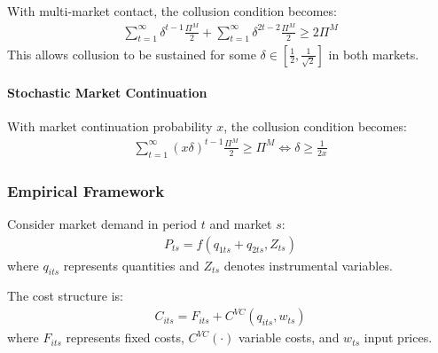 \documentclass[11pt]{elegantbook_2}
\begin{document}
With multi-market contact, the collusion condition becomes:
\begin{equation}
    \begin{aligned}
        \sum_{t=1}^\infty\delta^{t-1}\frac{\Pi^M}{2}+\sum_{t=1}^\infty\delta^{2t-2}\frac{\Pi^M}{2}\geq 2\Pi^M
    \end{aligned}
    \nonumber
\end{equation}
This allows collusion to be sustained for some $\delta\in \left[\frac{1}{2},\frac{1}{\sqrt{2}}\right]$ in both markets.

\paragraph*{Stochastic Market Continuation}
With market continuation probability $x$, the collusion condition becomes:
\begin{equation}
    \begin{aligned}
        \sum_{t=1}^\infty (x\delta)^{t-1}\frac{\Pi^M}{2}\geq \Pi^M
        \Leftrightarrow \delta\geq \frac{1}{2x}
    \end{aligned}
    \nonumber
\end{equation}

\subsubsection{Empirical Framework}
Consider market demand in period $t$ and market $s$:
\begin{equation}
    \begin{aligned}
        P_{ts}=f\left(q_{1ts}+q_{2ts},Z_{ts}\right)
    \end{aligned}
    \nonumber
\end{equation}
where $q_{its}$ represents quantities and $Z_{ts}$ denotes instrumental variables.

The cost structure is:
\begin{equation}
    \begin{aligned}
        C_{its}=F_{its}+C^{VC}\left(q_{its},w_{ts}\right)
    \end{aligned}
    \nonumber
\end{equation}
where $F_{its}$ represents fixed costs, $C^{VC}(\cdot)$ variable costs, and $w_{ts}$ input prices.
\end{document}
